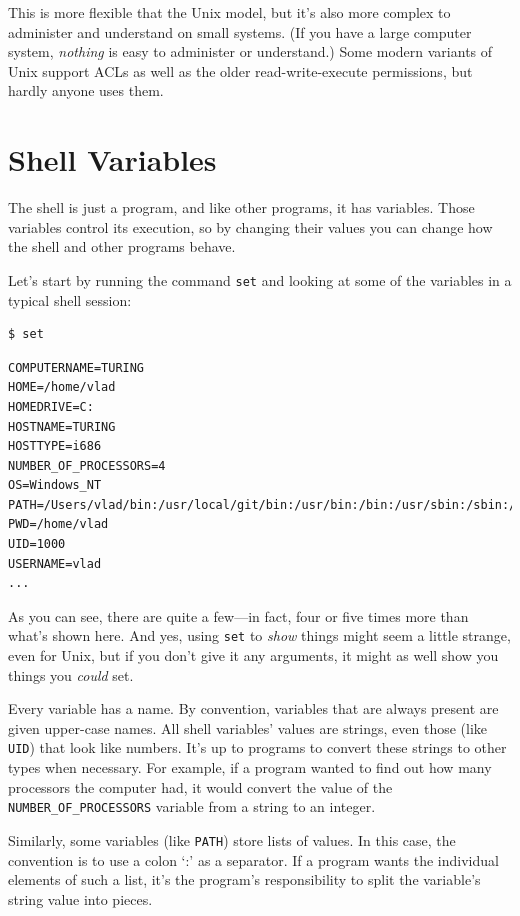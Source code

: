 \documentclass[]{book}
\begin{document}
This is more flexible that the Unix model, but it's also more complex to
administer and understand on small systems. (If you have a large
computer system, \emph{nothing} is easy to administer or understand.)
Some modern variants of Unix support ACLs as well as the older
read-write-execute permissions, but hardly anyone uses them.

\section{Shell Variables}

The shell is just a program, and like other programs, it has variables.
Those variables control its execution, so by changing their values you
can change how the shell and other programs behave.

Let's start by running the command \texttt{set} and looking at some of
the variables in a typical shell session:

\begin{verbatim}
$ set
\end{verbatim}

\begin{verbatim}
COMPUTERNAME=TURING
HOME=/home/vlad
HOMEDRIVE=C:
HOSTNAME=TURING
HOSTTYPE=i686
NUMBER_OF_PROCESSORS=4
OS=Windows_NT
PATH=/Users/vlad/bin:/usr/local/git/bin:/usr/bin:/bin:/usr/sbin:/sbin:/usr/local/bin
PWD=/home/vlad
UID=1000
USERNAME=vlad
...
\end{verbatim}

As you can see, there are quite a few---in fact, four or five times more
than what's shown here. And yes, using \texttt{set} to \emph{show}
things might seem a little strange, even for Unix, but if you don't give
it any arguments, it might as well show you things you \emph{could} set.

Every variable has a name. By convention, variables that are always
present are given upper-case names. All shell variables' values are
strings, even those (like \texttt{UID}) that look like numbers. It's up
to programs to convert these strings to other types when necessary. For
example, if a program wanted to find out how many processors the
computer had, it would convert the value of the
\texttt{NUMBER\_OF\_PROCESSORS} variable from a string to an integer.

Similarly, some variables (like \texttt{PATH}) store lists of values. In
this case, the convention is to use a colon `:' as a separator. If a
program wants the individual elements of such a list, it's the program's
responsibility to split the variable's string value into pieces.
\end{document}
